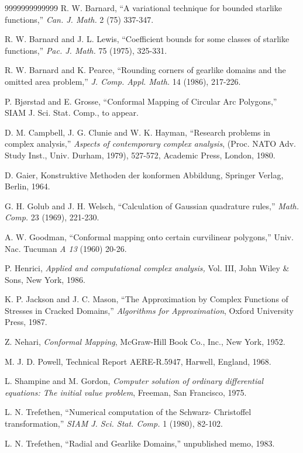 \documentclass[12pt]{article}%
\begin{document}
\begin{thebibliography}{9999999999999}
 R. W. Barnard, ``A variational technique
for bounded starlike functions,'' {\em Can. J. Math.} 2 (75) 337-347.

 R. W. Barnard and J. L. Lewis,
``Coefficient bounds for some classes of starlike functions,'' {\em Pac. J.
Math.}  75   (1975), 325-331.

 R. W. Barnard and K. Pearce, ``Rounding corners of 
gearlike domains and the omitted area problem,'' {\em J. Comp. 
Appl. Math.}  14  (1986), 217-226.

 P. Bj\o rstad and E. Grosse, ``Conformal Mapping
of Circular Arc Polygons,'' SIAM J. Sci. Stat. Comp., to
appear.

 D. M. Campbell, J. G. Clunie and W. K.
Hayman, ``Research problems in complex analysis,'' {\em Aspects of
contemporary complex analysis}, (Proc. NATO Adv. Study Inst., Univ.
Durham, 1979), 527-572, Academic Press, London, 1980.

 D. Gaier, Konstruktive Methoden der konformen
Abbildung, Springer Verlag, Berlin, 1964.

G. H. Golub and J. H. Welsch, ``Calculation of Gaussian 
quadrature rules,'' {\em Math. Comp.}   23   (1969), 221-230.

 A. W. Goodman, ``Conformal mapping onto certain
curvilinear polygons,'' Univ. Nac. Tucuman {\em A 13} (1960) 20-26.

 P. Henrici, {\em Applied and computational complex
analysis,} Vol. III, John Wiley \& Sons, New York, 1986.

 K. P. Jackson and J. C. Mason, ``The
Approximation by Complex Functions of Stresses in Cracked Domains,''
{\em Algorithms for Approximation}, Oxford University Press, 1987.

 Z. Nehari, {\em Conformal Mapping}, McGraw-Hill Book Co.,
Inc., New York, 1952.

 M. J. D. Powell, Technical Report AERE-R.5947, Harwell, 
England, 1968.

 L. Shampine and M. Gordon, {\em Computer
solution of ordinary differential equations: The initial value
problem}, Freeman, San Francisco, 1975.

 L. N. Trefethen, ``Numerical computation of the Schwarz-
Christoffel transformation,'' {\em SIAM J. Sci. Stat. Comp.}   1   
(1980), 82-102.

 L. N. Trefethen, ``Radial and Gearlike
Domains,'' unpublished memo, 1983.

\end{thebibliography}
\end{document}
